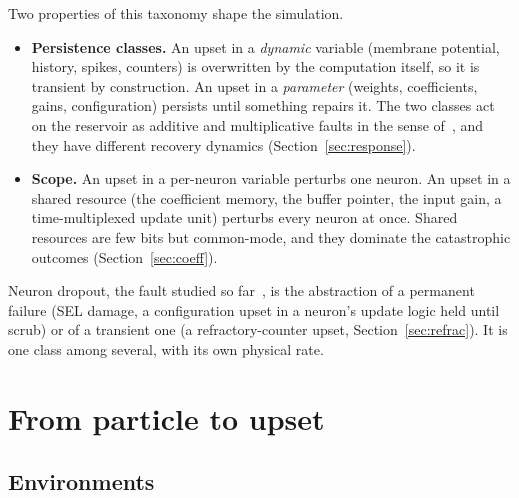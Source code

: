 \documentclass[11pt,a4paper]{article}
\begin{document}
Two properties of this taxonomy shape the simulation.
\begin{itemize}
  \item \textbf{Persistence classes.} An upset in a \emph{dynamic} variable (membrane potential, history, spikes, counters) is overwritten by the computation itself, so it is transient by construction. An upset in a \emph{parameter} (weights, coefficients, gains, configuration) persists until something repairs it. The two classes act on the reservoir as additive and multiplicative faults in the sense of~\cite{blanke2016}, and they have different recovery dynamics (Section~\ref{sec:response}).
  \item \textbf{Scope.} An upset in a per-neuron variable perturbs one neuron. An upset in a shared resource (the coefficient memory, the buffer pointer, the input gain, a time-multiplexed update unit) perturbs every neuron at once. Shared resources are few bits but common-mode, and they dominate the catastrophic outcomes (Section~\ref{sec:coeff}).
\end{itemize}
Neuron dropout, the fault studied so far~\cite{dropout2026}, is the abstraction of a permanent failure (SEL damage, a configuration upset in a neuron's update logic held until scrub) or of a transient one (a refractory-counter upset, Section~\ref{sec:refrac}). It is one class among several, with its own physical rate.

\section{From particle to upset}
\label{sec:physics}

\subsection{Environments}
\end{document}
